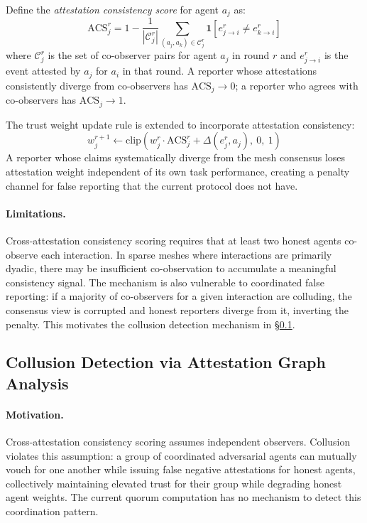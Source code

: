 Define the \emph{attestation consistency score} for agent $a_j$ as:
\[
\mathrm{ACS}_j^r = 1 - \frac{1}{|\mathcal{C}_j^r|} \sum_{(a_j, a_k) \in \mathcal{C}_j^r}
  \mathbf{1}\!\left[e_{j \to i}^r \neq e_{k \to i}^r\right]
\]
where $\mathcal{C}_j^r$ is the set of co-observer pairs for agent $a_j$ in round $r$
and $e_{j \to i}^r$ is the event attested by $a_j$ for $a_i$ in that round.  A
reporter whose attestations consistently diverge from co-observers has
$\mathrm{ACS}_j \to 0$; a reporter who agrees with co-observers has
$\mathrm{ACS}_j \to 1$.

The trust weight update rule is extended to incorporate attestation consistency:
\[
w_j^{r+1} \leftarrow \mathrm{clip}\!\left(w_j^r \cdot \mathrm{ACS}_j^r + \Delta(e_j^r, a_j),\ 0,\ 1\right)
\]
A reporter whose claims systematically diverge from the mesh consensus loses
attestation weight independent of its own task performance, creating a penalty
channel for false reporting that the current protocol does not have.

\paragraph{Limitations.}
Cross-attestation consistency scoring requires that at least two honest agents
co-observe each interaction.  In sparse meshes where interactions are primarily
dyadic, there may be insufficient co-observation to accumulate a meaningful
consistency signal.  The mechanism is also vulnerable to coordinated false
reporting: if a majority of co-observers for a given interaction are colluding,
the consensus view is corrupted and honest reporters diverge from it, inverting
the penalty.  This motivates the collusion detection mechanism in
\S\ref{sec:fw_collusion}.

\subsection{Collusion Detection via Attestation Graph Analysis}
\label{sec:fw_collusion}

\paragraph{Motivation.}
Cross-attestation consistency scoring assumes independent observers.  Collusion
violates this assumption: a group of coordinated adversarial agents can mutually
vouch for one another while issuing false negative attestations for honest agents,
collectively maintaining elevated trust for their group while degrading honest
agent weights.  The current quorum computation has no mechanism to detect this
coordination pattern.

